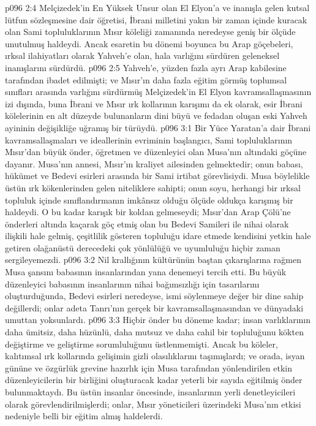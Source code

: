 \vs p096 2:4 Melçizedek’in En Yüksek Unsur olan El Elyon’a ve inanışla gelen kutsal lütfun sözleşmesine dair öğretisi, İbrani milletini yakın bir zaman içinde kuracak olan Sami topluluklarının Mısır köleliği zamanında neredeyse geniş bir ölçüde unutulmuş haldeydi. Ancak esaretin bu dönemi boyunca bu Arap göçebeleri, ırksal ilahiyatları olarak Yahveh’e olan, hala varlığını sürdüren geleneksel inanışlarını sürdürdü.
\vs p096 2:5 Yahveh’e, yüzden fazla ayrı Arap kabilesine tarafından ibadet edilmişti; ve Mısır’ın daha fazla eğitim görmüş toplumsal sınıfları arasında varlığını sürdürmüş Melçizedek’in El Elyon kavramsallaşmasının izi dışında, buna İbrani ve Mısır ırk kollarının karışımı da ek olarak, esir İbrani kölelerinin en alt düzeyde bulunanların dini büyü ve fedadan oluşan eski Yahveh ayininin değişikliğe uğramış bir türüydü.
\vs p096 3:1 Bir Yüce Yaratan’a dair İbrani kavramsallaşmaları ve ideallerinin evriminin başlangıcı, Sami topluluklarının Mısır’dan büyük önder, öğretmen ve düzenleyici olan Musa’nın altındaki göçüne dayanır. Musa’nın annesi, Mısır’ın kraliyet ailesinden gelmektedir; onun babası, hükümet ve Bedevi esirleri arasında bir Sami irtibat görevlisiydi. Musa böylelikle üstün ırk kökenlerinden gelen niteliklere sahipti; onun soyu, herhangi bir ırksal topluluk içinde sınıflandırmanın imkânsız olduğu ölçüde oldukça karışmış bir haldeydi. O bu kadar karışık bir koldan gelmeseydi; Mısır’dan Arap Çölü’ne önderleri altında kaçarak göç etmiş olan bu Bedevi Samileri ile nihai olarak ilişkili hale gelmiş, çeşitlilik gösteren topluluğu idare etmede kendisini yetkin hale getiren olağanüstü derecedeki çok yönlülüğü ve uyumluluğu hiçbir zaman sergileyemezdi.
\vs p096 3:2 Nil krallığının kültürünün baştan çıkarışlarına rağmen Musa şansını babasının insanlarından yana denemeyi tercih etti. Bu büyük düzenleyici babasının insanlarının nihai bağımsızlığı için tasarılarını oluşturduğunda, Bedevi esirleri neredeyse, ismi söylenmeye değer bir dine sahip değillerdi; onlar adeta Tanrı’nın gerçek bir kavramsallaşmasından ve dünyadaki umuttan yoksunlardı.
\vs p096 3:3 Hiçbir önder bu döneme kadar; insan varlıklarının daha ümitsiz, daha hüzünlü, daha mutsuz ve daha cahil bir topluluğunu kökten değiştirme ve geliştirme sorumluluğunu üstlenmemişti. Ancak bu köleler, kalıtımsal ırk kollarında gelişimin gizli olasılıklarını taşımışlardı; ve orada, isyan gününe ve özgürlük grevine hazırlık için Musa tarafından yönlendirilen etkin düzenleyicilerin bir birliğini oluşturacak kadar yeterli bir sayıda eğitilmiş önder bulunmaktaydı. Bu üstün insanlar öncesinde, insanlarının yerli denetleyicileri olarak görevlendirilmişlerdi; onlar, Mısır yöneticileri üzerindeki Musa’nın etkisi nedeniyle belli bir eğitim almış haldelerdi.
